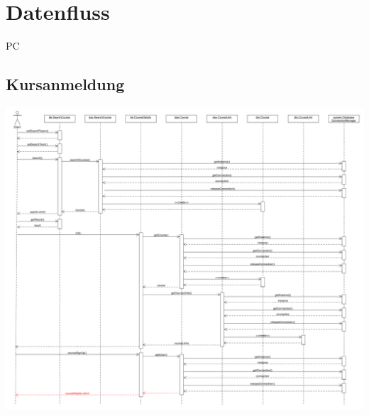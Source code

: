 \chapter{Datenfluss}

\begin{tiny}
PC
\end{tiny}

\section{Kursanmeldung}



\includegraphics[scale=0.26]{./Grafiken/Sequenzdiagramm-Kursanmeldung.pdf}